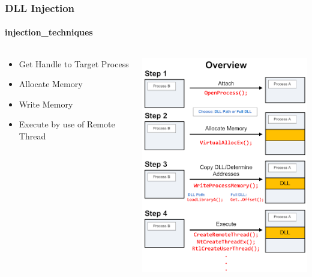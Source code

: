 \documentclass[aspectratio=169]{beamer}
\begin{document}
\begin{frame}
  \frametitle{DLL Injection}
  \framesubtitle{injection\_techniques}
  \begin{columns}
    \begin{column}{.3\textwidth}
      \begin{itemize}
      \item{Get Handle to Target Process}
      \item{Allocate Memory}
      \item{Write Memory}
      \item{Execute by use of Remote Thread} 
      \end{itemize}
    \end{column}
    \hfill
    \begin{column}{.7\textwidth}
      \begin{center}
        \includegraphics[scale=0.5]{dll-injection}
      \end{center}
    \end{column}
  \end{columns}
\end{frame}
\end{document}
